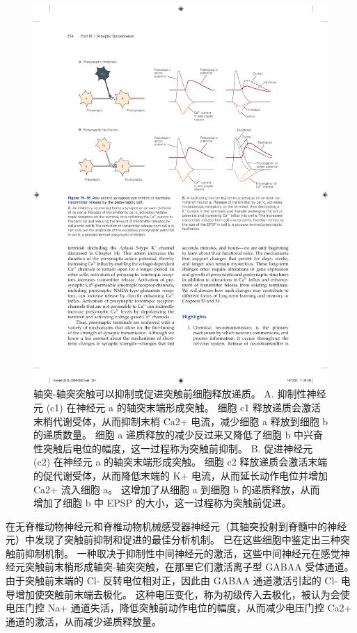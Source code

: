 \begin{figure}[htbp]
	\centering
	\includegraphics[width=0.85\linewidth]{chap15/fig_15_16}
	\caption{轴突-轴突突触可以抑制或促进突触前细胞释放递质。 A. 抑制性神经元 (c1) 在神经元 a 的轴突末端形成突触。 细胞 c1 释放递质会激活末梢代谢受体，从而抑制末梢 Ca2+ 电流，减少细胞 a 释放到细胞 b 的递质数量。 细胞 a 递质释放的减少反过来又降低了细胞 b 中兴奋性突触后电位的幅度，这一过程称为突触前抑制。 B. 促进神经元 (c2) 在神经元 a 的轴突末端形成突触。 细胞 c2 释放递质会激活末端的促代谢受体，从而降低末端的 K+ 电流，从而延长动作电位并增加 Ca2+ 流入细胞 a。 这增加了从细胞 a 到细胞 b 的递质释放，从而增加了细胞 b 中 EPSP 的大小，这一过程称为突触前促进。}
	\label{fig:15_16}
\end{figure}



在无脊椎动物神经元和脊椎动物机械感受器神经元（其轴突投射到脊髓中的神经元）中发现了突触前抑制和促进的最佳分析机制。 
已在这些细胞中鉴定出三种突触前抑制机制。 
一种取决于抑制性中间神经元的激活，这些中间神经元在感觉神经元突触前末梢形成轴突-轴突突触，在那里它们激活离子型 GABAA 受体通道。 
由于突触前末端的 Cl- 反转电位相对正，因此由 GABAA 通道激活引起的 Cl- 电导增加使突触前末端去极化。 
这种电压变化，称为初级传入去极化，被认为会使电压门控 Na+ 通道失活，降低突触前动作电位的幅度，从而减少电压门控 Ca2+ 通道的激活，从而减少递质释放量。


